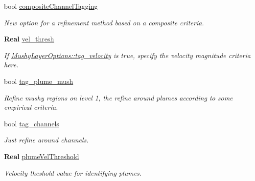 \begin{DoxyCompactItemize}
bool \hyperlink{struct_mushy_layer_options_ab64209e545edfc1784891b54d60aac5e}{composite\+Channel\+Tagging}
\begin{DoxyCompactList}\small\item\em New option for a refinement method based on a composite criteria. \end{DoxyCompactList}\item 
\mbox{\label{struct_mushy_layer_options_aaa6e2f84d08048bf850d463055334710}} 
\textbf{ Real} \hyperlink{struct_mushy_layer_options_aaa6e2f84d08048bf850d463055334710}{vel\+\_\+thresh}
\begin{DoxyCompactList}\small\item\em If \hyperlink{struct_mushy_layer_options_a34abc03bc7d8a50a7e3517a3df24e4db}{Mushy\+Layer\+Options\+::tag\+\_\+velocity} is true, specify the velocity magnitude criteria here. \end{DoxyCompactList}\item 
bool \hyperlink{struct_mushy_layer_options_ac65cf5a7ea59d60c33af0141d9d940c3}{tag\+\_\+plume\+\_\+mush}
\begin{DoxyCompactList}\small\item\em Refine mushy regions on level 1, the refine around plumes according to some empirical criteria. \end{DoxyCompactList}\item 
\mbox{\label{struct_mushy_layer_options_a65cf14658cc2885d6c2d5c8e0875a31b}} 
bool \hyperlink{struct_mushy_layer_options_a65cf14658cc2885d6c2d5c8e0875a31b}{tag\+\_\+channels}
\begin{DoxyCompactList}\small\item\em Just refine around channels. \end{DoxyCompactList}\item 
\mbox{\label{struct_mushy_layer_options_aef2b8175ef13294cdd87e521b89cc104}} 
\textbf{ Real} \hyperlink{struct_mushy_layer_options_aef2b8175ef13294cdd87e521b89cc104}{plume\+Vel\+Threshold}
\begin{DoxyCompactList}\small\item\em Velocity theshold value for identifying plumes. \end{DoxyCompactList}\item 
\mbox{\label{struct_mushy_layer_options_a496277fda822832718ebe3a32479b24b}} 

\end{DoxyCompactItemize}
